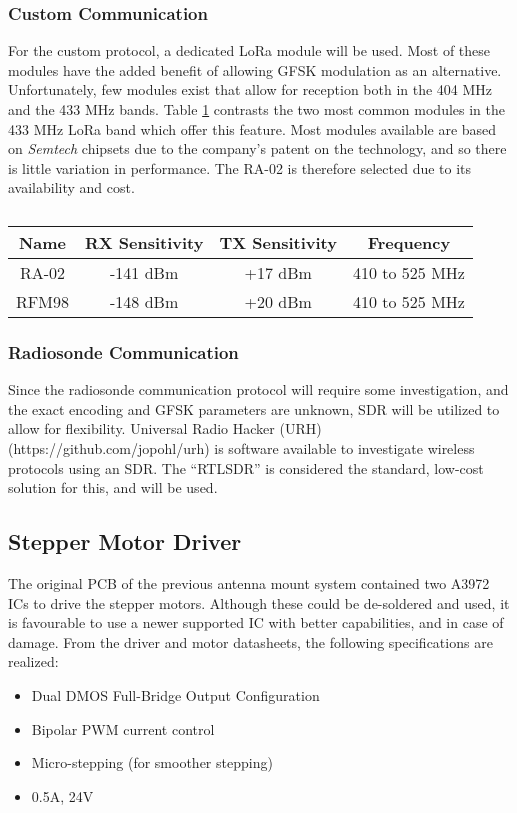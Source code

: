 \subsubsection{Custom Communication}
For the custom protocol, a dedicated LoRa module will be used. Most of these modules have the added benefit of allowing GFSK modulation as an alternative. Unfortunately, few modules exist that allow for reception both in the 404 MHz and the 433 MHz bands. Table \ref{tab:rfTransceivers} contrasts the two most common modules in the 433 MHz LoRa band which offer this feature. Most modules available are based on \textit{Semtech} chipsets due to the company's patent on the technology, and so there is little variation in performance. The RA-02 is therefore selected due to its availability and cost.

\begin{table}[!htb]
  \centering
  \renewcommand{\arraystretch}{1.2}
  \begin{tabular}{ |c|c|c|c| }
  \hline
  \textbf{Name}   & \textbf{RX Sensitivity} & \textbf{TX Sensitivity}& \textbf{Frequency} \\
  \hline
  RA-02           & -141 dBm             & +17 dBm              & 410 to 525 MHz     \\
  RFM98           & -148 dBm             & +20 dBm              & 410 to 525 MHz     \\
  \hline
  \end{tabular}
  \caption{}
  \label{tab:rfTransceivers}
\end{table}

\subsubsection{Radiosonde Communication}
Since the radiosonde communication protocol will require some investigation, and the exact encoding and GFSK parameters are unknown, SDR will be utilized to allow for flexibility. Universal Radio Hacker (URH) (https://github.com/jopohl/urh) is software available to investigate wireless protocols using an SDR. The “RTLSDR” is considered the standard, low-cost solution for this, and will be used.

\subsection{Stepper Motor Driver}
The original PCB of the previous antenna mount system contained two A3972 ICs to drive the stepper motors. Although these could be de-soldered and used, it is favourable to use a newer supported IC with better capabilities, and in case of damage. From the driver and motor datasheets, the following specifications are realized:
\begin{itemize}
    \item Dual DMOS Full-Bridge Output Configuration
    \item Bipolar PWM current control
    \item Micro-stepping (for smoother stepping)
    \item 0.5A, 24V
\end{itemize}

